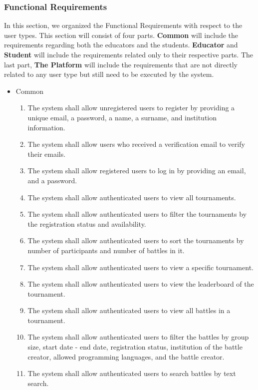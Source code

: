 \subsubsection{Functional Requirements}

In this section, we organized the Functional Requirements with respect to the user types. This section will consist of four parts. \textbf{Common} will include the requirements regarding both the educators and the students. \textbf{Educator} and \textbf{Student} will include the requirements related only to their respective parts. The last part, \textbf{The Platform} will include the requirements that are not directly related to any user type but still need to be executed by the system.

\begin{itemize}
	\item Common
	\begin{enumerate}
		\item The system shall allow unregistered users to register by providing a unique email, a password, a name, a surname, and institution information.
  \item The system shall allow users who received a verification email to verify their emails.
  \item The system shall allow registered users to log in by providing an email, and a password.
  \item The system shall allow authenticated users to view all tournaments.
  \item The system shall allow authenticated users to filter the tournaments by the registration status and availability. 
  \item The system shall allow authenticated users to sort the tournaments by number of participants and number of battles in it.
  \item The system shall allow authenticated users to view a specific tournament.
  \item The system shall allow authenticated users to view the leaderboard of the tournament.
  \item The system shall allow authenticated users to view all battles in a tournament.
  \item The system shall allow authenticated users to filter the battles by group size, start date - end date, registration status, institution of the battle creator, allowed programming languages, and the battle creator.
  \item The system shall allow authenticated users to search battles by text search.

\end{enumerate}
\end{itemize}
